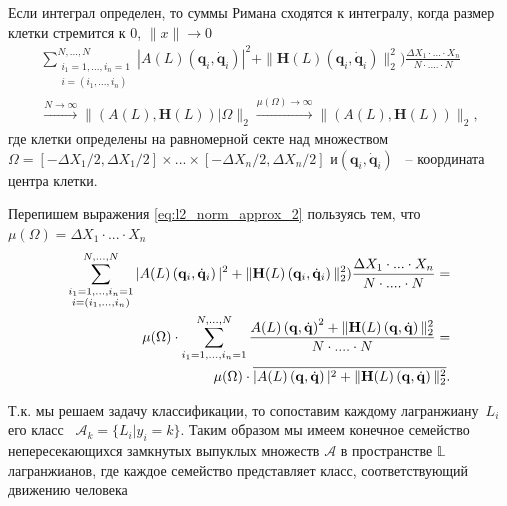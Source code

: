 \documentclass[a4paper, 12pt]{article}
\begin{document}
Если интеграл \label{eq:l2_norm_approx_1} определен, то суммы Римана сходятся к интегралу, когда размер клетки стремится к 0, $\|x\| \to 0$
\begin{equation}
\label{eq:l2_norm_approx_2}
\begin{split}
\sum_{\substack{i_1 = 1, ..., i_n = 1\\ i = (i_1, ..., i_n)}}^{N, ..., N} |A(L)\left(\mathbf{q}_i, \dot{\mathbf{q}}_i\right)|^2  + \|\mathbf{H}(L)\left(\mathbf{q}_i, \dot{\mathbf{q}}_i\right)\|_2^2) \frac{\Delta X_1 \cdot ... \cdot X_n}{N \cdot .... \cdot N}
\\
\overset{N \to \infty}{\longrightarrow}\|(A(L), \mathbf{H}(L))| \Omega\|_2
\overset{\mu(\Omega) \to \infty}{\longrightarrow} \|(A(L), \mathbf{H}(L))\|_2,
\end{split}
\end{equation}
где клетки определены на равномерной секте над множеством $\Omega = [-\Delta X_1/2,\Delta X_1/2]  \times ... \times  [-\Delta X_n/2,\Delta X_n/2]$ и$\left(\mathbf{q}_i, \dot{\mathbf{q}}_i\right)$ ~-- координата центра клетки.

Перепишем выражения \ref{eq:l2_norm_approx_2} пользуясь тем, что $\mu(\Omega) = \Delta X_1 \cdot ... \cdot X_n$
\begin{equation}
\label{eq:l2_norm_approx_main}
\centering
\begin{split}
\sum_{\substack{i_1 = 1, ..., i_n = 1\\ i = (i_1, ..., i_n)}}^{N, ..., N} |A(L)\left(\mathbf{q}_i, \dot{\mathbf{q}}_i\right)|^2  + \|\mathbf{H}(L)\left(\mathbf{q}_i, \dot{\mathbf{q}}_i\right)\|_2^2) \frac{\Delta X_1 \cdot ... \cdot X_n}{N \cdot .... \cdot N} =
\\
\mu(\Omega) \cdot \sum_{i_1 = 1, ..., i_n = 1}^{N, ..., N} \frac{A(L)\left(\mathbf{q}, \dot{\mathbf{q}}\right)^2 + \|\mathbf{H}(L)\left(\mathbf{q}, \dot{\mathbf{q}}\right)\|_2^2}{N \cdot .... \cdot N} =  
\\ 
\mu(\Omega) \cdot \overline{|A(L)\left(\mathbf{q}, \dot{\mathbf{q}}\right)|^2 + \|\mathbf{H}(L)\left(\mathbf{q}, \dot{\mathbf{q}}\right)\|_2^2}.
\end{split}   
\end{equation}

Т.к. мы решаем задачу классификации, то сопоставим каждому лагранжиану~$L_i$ его класс ~$\mathcal{A}_{k} = \{L_i| y_i = k\}$. Таким образом мы имеем конечное семейство непересекающихся замкнутых выпуклых множеств $\mathcal{A}$ в пространстве  $\mathbb{L}$ лагранжианов, где каждое семейство представляет класс, соответствующий движению человека
\end{document}
